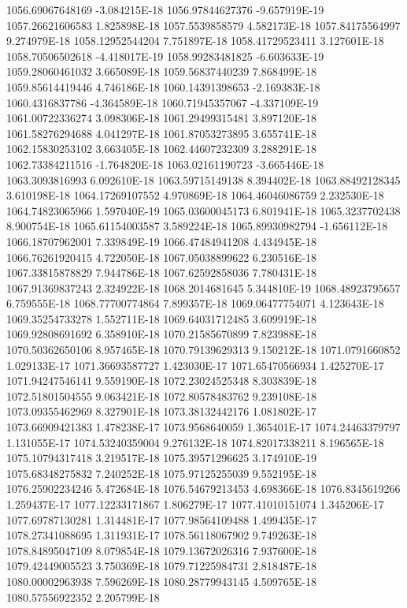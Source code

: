 1056.69067648169  -3.084215E-18
1056.97844627376  -9.657919E-19
1057.26621606583  1.825898E-18
1057.5539858579  4.582173E-18
1057.84175564997  9.274979E-18
1058.12952544204  7.751897E-18
1058.41729523411  3.127601E-18
1058.70506502618  -4.418017E-19
1058.99283481825  -6.603633E-19
1059.28060461032  3.665089E-18
1059.56837440239  7.868499E-18
1059.85614419446  4.746186E-18
1060.14391398653  -2.169383E-18
1060.4316837786  -4.364589E-18
1060.71945357067  -4.337109E-19
1061.00722336274  3.098306E-18
1061.29499315481  3.897120E-18
1061.58276294688  4.041297E-18
1061.87053273895  3.655741E-18
1062.15830253102  3.663405E-18
1062.44607232309  3.288291E-18
1062.73384211516  -1.764820E-18
1063.02161190723  -3.665446E-18
1063.3093816993  6.092610E-18
1063.59715149138  8.394402E-18
1063.88492128345  3.610198E-18
1064.17269107552  4.970869E-18
1064.46046086759  2.232530E-18
1064.74823065966  1.597040E-19
1065.03600045173  6.801941E-18
1065.3237702438  8.900754E-18
1065.61154003587  3.589224E-18
1065.89930982794  -1.656112E-18
1066.18707962001  7.339849E-19
1066.47484941208  4.434945E-18
1066.76261920415  4.722050E-18
1067.05038899622  6.230516E-18
1067.33815878829  7.944786E-18
1067.62592858036  7.780431E-18
1067.91369837243  2.324922E-18
1068.2014681645  5.344810E-19
1068.48923795657  6.759555E-18
1068.77700774864  7.899357E-18
1069.06477754071  4.123643E-18
1069.35254733278  1.552711E-18
1069.64031712485  3.609919E-18
1069.92808691692  6.358910E-18
1070.21585670899  7.823988E-18
1070.50362650106  8.957465E-18
1070.79139629313  9.150212E-18
1071.0791660852  1.029133E-17
1071.36693587727  1.423030E-17
1071.65470566934  1.425270E-17
1071.94247546141  9.559190E-18
1072.23024525348  8.303839E-18
1072.51801504555  9.063421E-18
1072.80578483762  9.239108E-18
1073.09355462969  8.327901E-18
1073.38132442176  1.081802E-17
1073.66909421383  1.478238E-17
1073.9568640059  1.365401E-17
1074.24463379797  1.131055E-17
1074.53240359004  9.276132E-18
1074.82017338211  8.196565E-18
1075.10794317418  3.219517E-18
1075.39571296625  3.174910E-19
1075.68348275832  7.240252E-18
1075.97125255039  9.552195E-18
1076.25902234246  5.472684E-18
1076.54679213453  4.698366E-18
1076.8345619266  1.259437E-17
1077.12233171867  1.806279E-17
1077.41010151074  1.345206E-17
1077.69787130281  1.314481E-17
1077.98564109488  1.499435E-17
1078.27341088695  1.311931E-17
1078.56118067902  9.749263E-18
1078.84895047109  8.079854E-18
1079.13672026316  7.937600E-18
1079.42449005523  3.750369E-18
1079.71225984731  2.818487E-18
1080.00002963938  7.596269E-18
1080.28779943145  4.509765E-18
1080.57556922352  2.205799E-18
